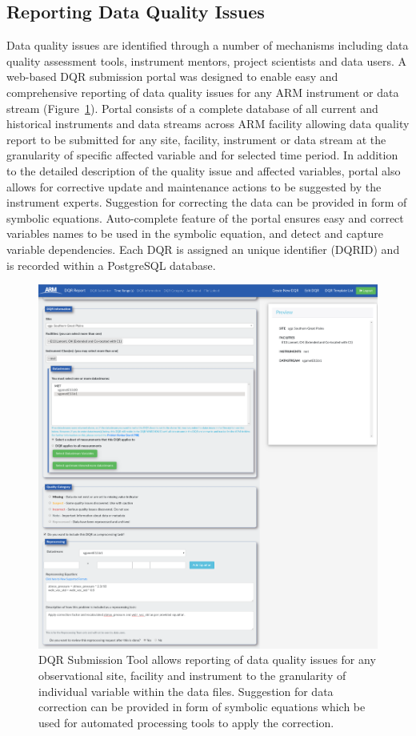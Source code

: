 \subsection{Reporting Data Quality Issues}
Data quality issues are identified through a number of mechanisms
including data quality assessment tools, instrument mentors, project
scientists and data users. 
A web-based DQR submission portal was designed to enable easy 
and comprehensive reporting of data quality issues for
any ARM instrument or data stream (Figure~\ref{fig:dqr_tool}). Portal
consists of a complete database of all current and historical
instruments and data streams across ARM facility allowing data quality
report to be submitted for any site, facility, instrument or data stream
at the granularity of specific affected variable and for selected time
period. In addition to the detailed description of the quality issue and
affected variables, portal also allows for corrective update and
maintenance actions to be suggested by the instrument experts.
Suggestion for correcting the data can be provided in form of symbolic
equations. Auto-complete feature of the portal ensures easy and correct
variables names to be used in the symbolic equation, and detect and
capture variable dependencies. Each DQR is assigned an unique identifier
(DQRID) and is recorded within a PostgreSQL database.

\begin{figure}
 \includegraphics[width=\columnwidth]{figures/dqr_tool.png}
 \caption{DQR Submission Tool allows reporting of data quality issues
	for any observational site, facility and instrument to the
	granularity of individual variable within the data files. Suggestion
 for data correction can be provided in form of symbolic equations which
 be used for automated processing tools to apply the correction.}
 \label{fig:dqr_tool}
\end{figure}
